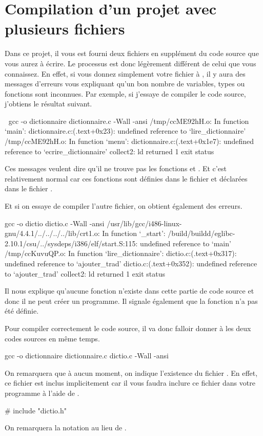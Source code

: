 \documentclass[a4paper]{article}
\begin{document}
	\section{Compilation d'un projet avec plusieurs fichiers}\label{sec-CompilationDUnProjetAvecPlusieursFichiers}
		Dans ce projet, il vous est fourni deux fichiers en supplément du code source que vous aurez à écrire.
		Le processus est donc légèrement différent de celui que vous connaissez.
		En effet, si vous donnez simplement votre fichier  à , il y aura des messages d'erreurs vous expliquant qu'un bon nombre de variables, types ou fonctions sont inconnues.
		Par exemple, si j'essaye de compiler le code source, j'obtiens le résultat suivant.
		\begin{Code*}[language={}]
$~$ gcc -o dictionnaire dictionnaire.c -Wall -ansi
/tmp/ccME92hH.o: In function `main':
dictionnaire.c:(.text+0x23): undefined reference to `lire_dictionnaire'
/tmp/ccME92hH.o: In function `menu':
dictionnaire.c:(.text+0x1e7): undefined reference to `ecrire_dictionnaire'
collect2: ld returned 1 exit status
		\end{Code*}
		Ces messages veulent dire qu'il ne trouve pas les fonctions  et .
		Et c'est relativement normal car ces fonctions sont définies dans le fichier  et déclarées dans le fichier .

		Et si on essaye de compiler l'autre fichier, on obtient également des erreurs.
		\begin{Code*}[language={}]
gcc -o dictio dictio.c -Wall -ansi
/usr/lib/gcc/i486-linux-gnu/4.4.1/../../../../lib/crt1.o: In function `_start':
/build/buildd/eglibc-2.10.1/csu/../sysdeps/i386/elf/start.S:115: undefined reference to `main'
/tmp/ccKuvuQP.o: In function `lire_dictionnaire':
dictio.c:(.text+0x317): undefined reference to `ajouter_trad'
dictio.c:(.text+0x352): undefined reference to `ajouter_trad'
collect2: ld returned 1 exit status
		\end{Code*}
		Il nous explique qu'aucune fonction  n'existe dans cette partie de code source et donc il ne peut créer un programme.
		Il signale également que la fonction  n'a pas été définie.

		Pour compiler correctement le code source, il va donc falloir donner à  les deux codes sources en même temps.
		\begin{Code*}
gcc -o dictionnaire dictionnaire.c dictio.c -Wall -ansi
		\end{Code*}

		On remarquera que à aucun moment, on indique l'existence du fichier .
		En effet, ce fichier est inclus implicitement car il vous faudra inclure ce fichier dans votre programme à l'aide de .
		\begin{Code*}
# include "dictio.h"
		\end{Code*}
		On remarquera la notation  au lieu de .
\end{document}
